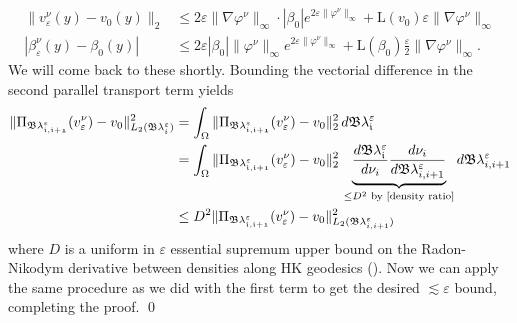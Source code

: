 \documentclass[11pt]{article}
\begin{document}
\begin{align*}
    \|v_\varepsilon^\nu(y) - v_0(y)\|_2 &\leq 2\varepsilon\|\nabla\varphi^\nu\|_\infty\cdot |\beta_0|e^{2\varepsilon\|\varphi^\nu\|_\infty} + \text{L}(v_0)\varepsilon\|\nabla\varphi^\nu\|_\infty \\
    |\beta_\varepsilon^\nu(y) - \beta_0(y)| &\leq 2\varepsilon|\beta_0|\|\varphi^\nu\|_\infty e^{2\varepsilon\|\varphi^\nu\|_\infty} + \text{L}(\beta_0)\frac{\varepsilon}{2}\|\nabla\varphi^\nu\|_\infty.
\end{align*}
We will come back to these shortly. Bounding the vectorial difference in the second parallel transport term yields
\begin{align*}
    \|\Pi_{\mathfrak{B \lambda_{i, i+1}^\varepsilon}}(v_\varepsilon^\nu) - v_0\|_{L_2(\mathfrak{B}\lambda_i^\varepsilon)}^2 &= \int_{\Omega}\|\Pi_{\mathfrak{B \lambda_{i, i+1}^\varepsilon}}(v_\varepsilon^\nu) - v_0\|_2^2 \, d\mathfrak{B\lambda_i^\varepsilon} \\
    &= \int_{\Omega}\|\Pi_{\mathfrak{B \lambda_{i, i+1}^\varepsilon}}(v_\varepsilon^\nu) - v_0\|_2^2 \, \underbrace{\frac{d\mathfrak{B\lambda_i^\varepsilon}}{d\nu_i}\frac{d\nu_i}{d\mathfrak{B}\lambda_{i, i+1}^\varepsilon}}_{\leq D^2 \text{ by \Cref{density ratio}}}d\mathfrak{B}\lambda_{i, i+1}^\varepsilon \\
    &\leq D^2\|\Pi_{\mathfrak{B \lambda_{i, i+1}^\varepsilon}}(v_\varepsilon^\nu) - v_0\|_{L_2(\mathfrak{B}\lambda_{i, i+1}^\varepsilon)}^2
\end{align*}
where $D$ is a uniform in $\varepsilon$ essential supremum upper bound on the Radon-Nikodym derivative between densities along HK geodesics (). Now we can apply the same procedure as we did with the first term to get the desired $\lesssim \varepsilon$ bound, completing the proof. \qed{}
\end{document}
